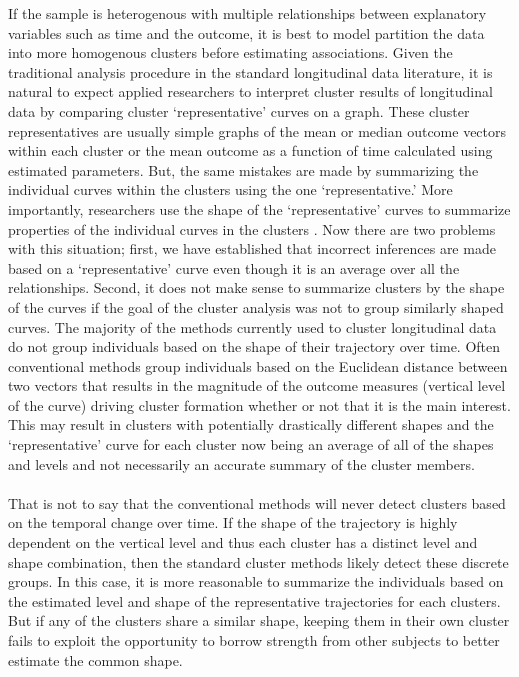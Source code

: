 \documentclass[12pt]{article}
\begin{document}
If the sample is heterogenous with multiple relationships between explanatory variables such as time and the outcome, it is best to model partition the data into more homogenous clusters before estimating associations. Given the traditional analysis procedure in the standard longitudinal data literature, it is natural to expect applied researchers to interpret cluster results of longitudinal data by comparing cluster `representative' curves on a graph. These cluster representatives are usually simple graphs of the mean or median outcome vectors within each cluster or the mean outcome as a function of time calculated using estimated parameters. But, the same mistakes are made by summarizing the individual curves within the clusters using the one `representative.' More importantly, researchers use the shape of the `representative' curves to summarize properties of the individual curves in the clusters \cite{windle2004,mulvaney2006,broadbent2008,pryor2011,mccoy2010}. Now there are two problems with this situation; first, we have established that incorrect inferences are made based on a `representative' curve  even though it is an average over all the relationships. Second, it does not make sense to summarize clusters by the shape of the curves if the goal of the cluster analysis was not to group similarly shaped curves. The majority of the methods currently used to cluster longitudinal data do not group individuals based on the shape of their trajectory over time. Often conventional methods group individuals based on the Euclidean distance between two vectors that results in the magnitude of the outcome measures (vertical level of the curve) driving cluster formation whether or not that it is the main interest. This may result in clusters with potentially drastically different shapes and the `representative' curve for each cluster now being an average of all of the shapes and levels and not necessarily an accurate summary of the cluster members. \\\\
That is not to say that the conventional methods will never detect clusters based on the temporal change over time. If the shape of the trajectory is highly dependent on the vertical level and thus each cluster has a distinct level and shape combination, then the standard cluster methods likely detect these discrete groups. In this case, it is more reasonable to summarize the individuals based on the estimated level and shape of the representative trajectories for each clusters. But if any of the clusters share a similar shape, keeping them in their own cluster fails to exploit the opportunity to borrow strength from other subjects to better estimate the common shape.\\\\
\end{document}
